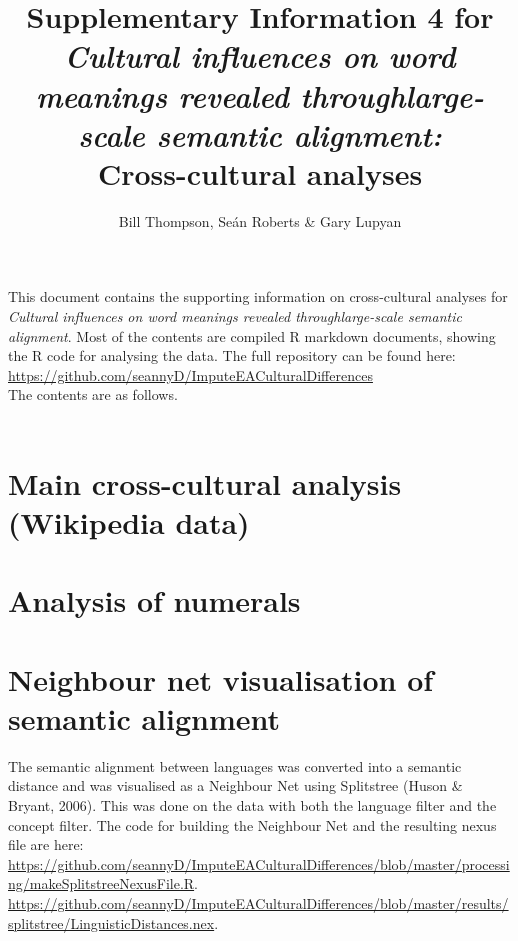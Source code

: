\documentclass[notitlepage]{report}
\makeatletter
\newcommand*{\toccontents}{\@starttoc{toc}}
\makeatother
\begin{document}
\title{Supplementary Information 4 for \\ \emph{Cultural influences on word meanings revealed throughlarge-scale semantic alignment:}\\Cross-cultural analyses}
\author{Bill Thompson, Se\'{a}n Roberts \& Gary Lupyan}
\date{}
\maketitle

This document contains the supporting information on cross-cultural analyses for \emph{Cultural influences on word meanings revealed throughlarge-scale semantic alignment}.  Most of the contents are compiled R markdown documents, showing the R code for analysing the data. The full repository can be found here:\\
\url{https://github.com/seannyD/ImputeEACulturalDifferences}\\
The contents are as follows.  \\\\
\toccontents

\setcounter{chapter}{4}

\newpage
\section{Main cross-cultural analysis (Wikipedia data)}



\newpage
\section{Analysis of numerals}



\clearpage
\newpage
\section{Neighbour net visualisation of semantic alignment}

The semantic alignment between languages was converted into a semantic distance and was visualised as a Neighbour Net using Splitstree (Huson \& Bryant, 2006). This was done on the data with both the language filter and the concept filter. The code for building the Neighbour Net and the resulting nexus file are here: \\ {\scriptsize \url{https://github.com/seannyD/ImputeEACulturalDifferences/blob/master/processing/makeSplitstreeNexusFile.R}}. \\ {\scriptsize \url{https://github.com/seannyD/ImputeEACulturalDifferences/blob/master/results/splitstree/LinguisticDistances.nex}}.
\end{document}
